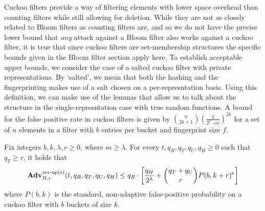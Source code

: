 Cuckoo filters provide a way of filtering elements with lower space overhead than counting filters while still allowing for deletion. While they are not as closely related to Bloom filters as counting filters are, and so we do not have the precise lower bound that \textit{any} attack against a Bloom filter also works against a cuckoo filter, it is true that since cuckoo filters are set-membership structures the specific bounds given in the Bloom filter section apply here. To establish acceptable upper bounds, we consider the case of a salted cuckoo filter with private representations. By `salted', we mean that both the hashing and the fingerprinting makes use of a salt chosen on a per-represntation basis. Using this definition, we can make use of the lemmas that allow us to talk about the structure in the single-represntation case with true random functions. A bound for the false positive rate in cuckoo filters is given by $\binom{n}{2k+1}\left(\frac{2}{2^f \cdot cn}\right)^{2k}$ for a set of $n$ elements in a filter with $b$ entries per bucket and fingerprint size $f$.

\begin{theorem}\label{thm:cuckoo-salt-bound}
Fix integers $b, k, \lambda, r\geq 0$, where $m \geq \lambda$.
  For every $t, q_R, q_T, q_U, q_H \geq 0$ such that $q_T \geq r$, it holds that
  $$\Adv{\erreps}_{\struct,r}(t, q_R, q_T, q_U, q_H) \leq q_R \cdot
     \left[
      \frac{q_H}{2^\lambda} +
      {\dbinom{q_T+q_U}{r}} P(b,k+r)^r
    \right]$$
where $P(b,k)$ is the standard, non-adaptive false-positive probability on a cuckoo filter with $b$ buckets of size $k$.
\end{theorem}

